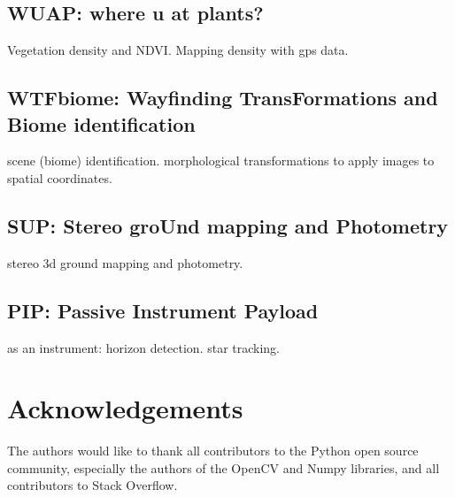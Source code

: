 \documentclass[conference]{IEEEtran} %
\begin{document}
\subsection{WUAP: where u at plants?}
Vegetation density and NDVI. Mapping density with gps data.

\subsection{WTFbiome: Wayfinding TransFormations and Biome identification}
scene (biome) identification.
morphological transformations to apply images to spatial coordinates.

\subsection{SUP: Stereo groUnd mapping and Photometry}
stereo 3d ground mapping and photometry.

\subsection{PIP: Passive Instrument Payload}
as an instrument: horizon detection. star tracking.

\section*{Acknowledgements}
The authors would like to thank all contributors to the Python open source community, especially the authors of the OpenCV and Numpy libraries, and all contributors to Stack Overflow.




\onecolumn
\appendices{}
\end{document}
